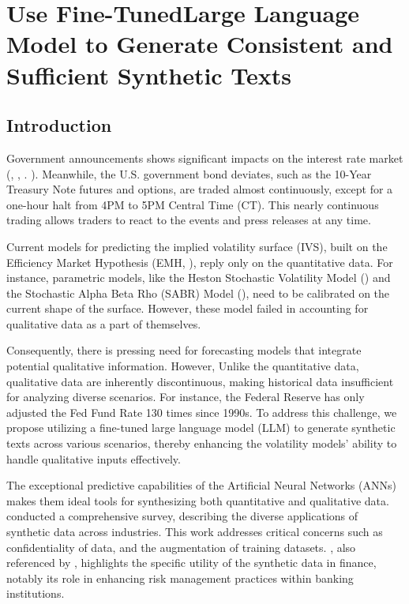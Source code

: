 \graphicspath{{Chapter3/Chapter3Figs/}{Chapter3/Chapter3Figs/}}
 
\chapter{Use Fine-TunedLarge Language Model to Generate Consistent and Sufficient Synthetic Texts}\label{ch:chapter:3}

\section{Introduction}\label{ch3:sec:introduction}  
Government announcements shows significant impacts on the interest rate market (\cite{vergote2012}, \cite{rosa2013financial}, \cite{jubinski2013fomc}. ). Meanwhile, the U.S. government bond deviates, such as the 10-Year Treasury Note futures and options, are traded almost continuously, except for a one-hour halt from 4PM to 5PM Central Time (CT). This nearly continuous trading allows traders to react to the events and press releases at any time. 

Current models for predicting the implied volatility surface (IVS),  built on the Efficiency Market Hypothesis (EMH, \cite{fama1970}), reply only on the quantitative data. For instance, parametric models, like the Heston Stochastic Volatility Model (\cite{Heston:1993}) and the Stochastic Alpha Beta Rho (SABR) Model (\cite{sabr2002}), need to be calibrated on the current shape of the surface. However, these model failed in accounting for qualitative data as a part of themselves. 

Consequently, there is pressing need for forecasting models that integrate potential qualitative information. However, Unlike the quantitative data, qualitative data are  inherently discontinuous, making historical data insufficient for analyzing diverse scenarios. For instance, the Federal Reserve has only adjusted the Fed Fund Rate 130 times since 1990s. To address this challenge, we propose utilizing a fine-tuned large language model (LLM) to generate synthetic texts across various scenarios, thereby enhancing the volatility models' ability to handle qualitative inputs effectively.


The exceptional predictive capabilities of the Artificial Neural Networks (ANNs) makes them ideal tools for synthesizing both quantitative and qualitative data. \cite{guo2024generative} conducted a comprehensive survey, describing the diverse applications of synthetic data across industries. This work addresses critical concerns such as confidentiality of data, and the augmentation of training datasets. \cite{potluru2023synthetic}, also referenced by \cite{assefa2020generating}, highlights the specific utility of the synthetic data in finance, notably its role in enhancing risk management practices within banking institutions.



